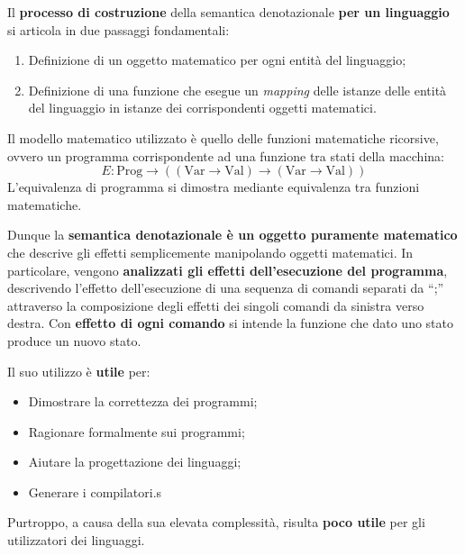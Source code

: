 \documentclass[a4paper]{article}
\newcommand{\dquotes}[1]{``#1''}
\begin{document}
	\noindent
	Il \textbf{processo di costruzione} della semantica denotazionale \textbf{per un linguaggio} si articola in due passaggi fondamentali:
	\begin{enumerate}
		\item Definizione di un oggetto matematico per ogni entità del linguaggio;
		
		\item Definizione di una funzione che esegue un \emph{mapping} delle istanze delle entità del linguaggio in istanze dei corrispondenti oggetti matematici.
	\end{enumerate}
	Il modello matematico utilizzato è quello delle funzioni matematiche ricorsive, ovvero un programma corrispondente ad una funzione tra stati della macchina:
	\begin{equation*}
		E: \mathrm{Prog} \longrightarrow \left( \left(\mathrm{Var} \rightarrow \mathrm{Val}\right) \longrightarrow \left(\mathrm{Var} \rightarrow \mathrm{Val}\right) \right)
	\end{equation*}
	L'equivalenza di programma si dimostra mediante equivalenza tra funzioni matematiche.\newline
	
	\noindent
	Dunque la \textbf{semantica denotazionale è un oggetto puramente matematico} che descrive gli effetti semplicemente manipolando oggetti matematici.\newline
	In particolare, vengono \textbf{analizzati gli effetti dell'esecuzione del programma}, descrivendo l'effetto dell'esecuzione di una sequenza di comandi separati da \dquotes{;} attraverso la composizione degli effetti dei singoli comandi da sinistra verso destra.\newline
	Con \textbf{effetto di ogni comando} si intende la funzione che dato uno stato produce un nuovo stato.\newline
	
	\noindent
	Il suo utilizzo è \textcolor{Green4}{\textbf{utile}} per:
	\begin{itemize}
		\item Dimostrare la correttezza dei programmi;
		\item Ragionare formalmente sui programmi;
		\item Aiutare la progettazione dei linguaggi;
		\item Generare i compilatori.s
	\end{itemize}
	Purtroppo, a causa della sua elevata complessità, risulta \textcolor{Red3}{\textbf{poco utile}} per gli utilizzatori dei linguaggi.\newpage
	
\end{document}
